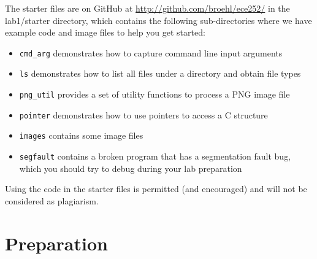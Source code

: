 The starter files are on GitHub at \url{http://github.com/broehl/ece252/} in the lab1/starter directory, which contains the following sub-directories where we have example code and image files to help you get started:
\begin{itemize}
    \item \verb+cmd_arg+ demonstrates how to capture command line input arguments
    \item \verb+ls+ demonstrates how to list all files under a directory and obtain file types
    \item \verb+png_util+ provides a set of utility functions to process a PNG image file
    \item \verb+pointer+ demonstrates how to use pointers to access a C structure
    \item \verb+images+ contains some image files
    \item \verb+segfault+ contains a broken program that has a segmentation fault bug, which you should try to debug during your lab preparation
\end{itemize}
Using the code in the starter files is permitted (and encouraged) and will not be considered as plagiarism.

\section{Preparation}

